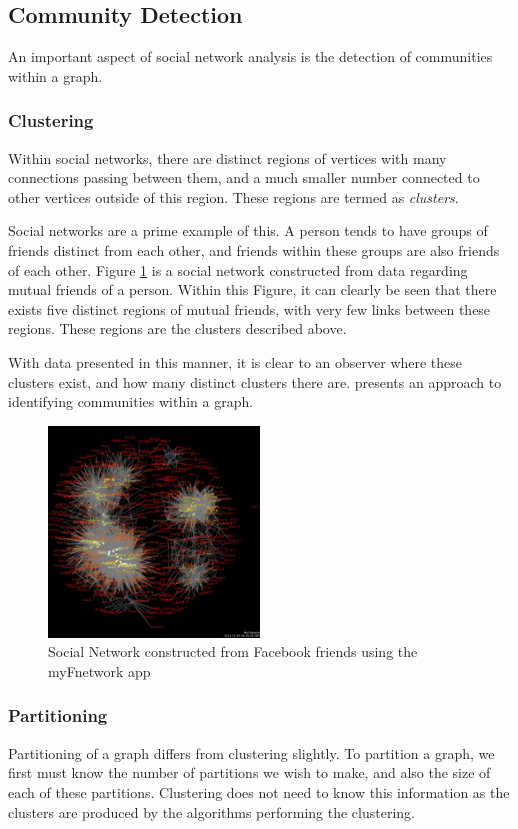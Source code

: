 \subsection{Community Detection}
An important aspect of social network analysis is the detection of communities within a graph.

\subsubsection{Clustering}
Within social networks, there are distinct regions of vertices with many connections passing between them, and a much smaller number connected to other vertices outside of this region. These regions are termed as \emph{clusters}.

Social networks are a prime example of this. A person tends to have groups of friends distinct from each other, and friends within these groups are also friends of each other. Figure \ref{fig:socialnetwork} is a social network constructed from data regarding mutual friends of a person. Within this Figure, it can clearly be seen that there exists five distinct regions of mutual friends, with very few links between these regions. These regions are the clusters described above.

With data presented in this manner, it is clear to an observer where these clusters exist, and how many distinct clusters there are. \cite{girvan02} presents an approach to identifying communities within a graph.

\begin{figure}[htbp]
\centering
\includegraphics[width=0.5\textwidth]{./img/socialnetwork.png}
\caption{Social Network constructed from Facebook friends using the myFnetwork app}
\label{fig:socialnetwork}
\end{figure}

\subsubsection{Partitioning}
Partitioning of a graph differs from clustering slightly. To partition a graph, we first must know the number of partitions we wish to make, and also the size of each of these partitions. Clustering does not need to know this information as the clusters are produced by the algorithms performing the clustering.

